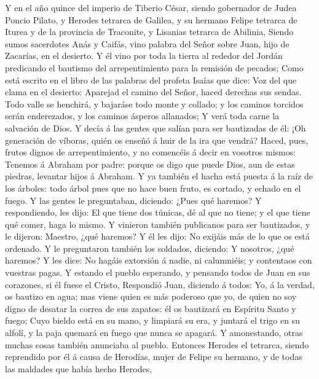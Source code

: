  Y en el año quince del imperio de Tiberio César, siendo
gobernador de Judea Poncio Pilato, y Herodes tetrarca de Galilea, y su
hermano Felipe tetrarca de Iturea y de la provincia de Traconite, y
Lisanias tetrarca de Abilinia,  Siendo sumos sacerdotes Anás
y Caifás, vino palabra del Señor sobre Juan, hijo de Zacarías, en el
desierto.  Y él vino por toda la tierra al rededor del
Jordán predicando el bautismo del arrepentimiento para la remisión de
pecados;  Como está escrito en el libro de las palabras del
profeta Isaías que dice: Voz del que clama en el desierto: Aparejad el
camino del Señor, haced derechas sus sendas.  Todo valle se
henchirá, y bajaráse todo monte y collado; y los caminos torcidos serán
enderezados, y los caminos ásperos allanados;  Y verá toda
carne la salvación de Dios.  Y decía á las gentes que salían
para ser bautizadas de él: ¡Oh generación de víboras, quién os enseñó á
huir de la ira que vendrá?  Haced, pues, frutos dignos de
arrepentimiento, y no comencéis á decir en vosotros mismos: Tenemos á
Abraham por padre: porque os digo que puede Dios, aun de estas piedras,
levantar hijos á Abraham.  Y ya también el hacha está puesta
á la raíz de los árboles: todo árbol pues que no hace buen fruto, es
cortado, y echado en el fuego.  Y las gentes le
preguntaban, diciendo: ¿Pues qué haremos?  Y respondiendo,
les dijo: El que tiene dos túnicas, dé al que no tiene; y el que tiene
qué comer, haga lo mismo.  Y vinieron también publicanos
para ser bautizados, y le dijeron: Maestro, ¿qué haremos? 
Y él les dijo: No exijáis más de lo que os está ordenado. 
Y le preguntaron también los soldados, diciendo: Y nosotros, ¿qué
haremos? Y les dice: No hagáis extorsión á nadie, ni calumniéis; y
contentaos con vuestras pagas.  Y estando el pueblo
esperando, y pensando todos de Juan en sus corazones, si él fuese el
Cristo,  Respondió Juan, diciendo á todos: Yo, á la verdad,
os bautizo en agua; mas viene quien es más poderoso que yo, de quien no
soy digno de desatar la correa de sus zapatos: él os bautizará en
Espíritu Santo y fuego;  Cuyo bieldo está en su mano, y
limpiará su era, y juntará el trigo en su alfolí, y la paja quemará en
fuego que nunca se apagará.  Y amonestando, otras muchas
cosas también anunciaba al pueblo.  Entonces Herodes el
tetrarca, siendo reprendido por él á causa de Herodías, mujer de Felipe
su hermano, y de todas las maldades que había hecho Herodes,
